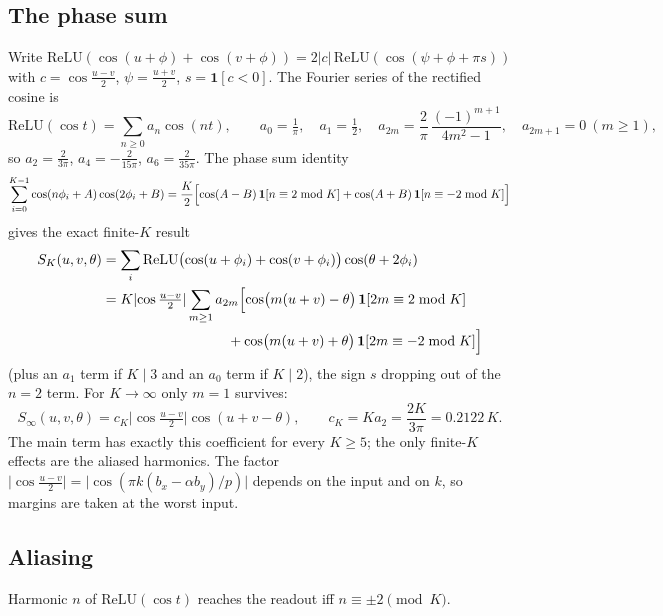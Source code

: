 \documentclass[11pt]{article}
\theoremstyle{remark}
\newcommand{\relu}{\mathrm{ReLU}}
\newcommand{\abs}[1]{\lvert #1 \rvert}
\newcommand{\ind}[1]{\mathbf{1}[#1]}
\begin{document}
\subsection{The phase sum}

Write $\relu(\cos(u+\phi) + \cos(v+\phi)) = 2\abs{c}\,\relu(\cos(\psi + \phi + \pi s))$ with $c = \cos\tfrac{u-v}{2}$,
$\psi = \tfrac{u+v}{2}$, $s = \ind{c < 0}$. The Fourier series of the rectified cosine is
\[
\relu(\cos t) = \sum_{n \ge 0} a_n \cos(nt), \qquad a_0 = \tfrac{1}{\pi},\quad a_1 = \tfrac12,\quad
a_{2m} = \frac{2}{\pi}\,\frac{(-1)^{m+1}}{4m^2 - 1},\quad a_{2m+1} = 0\ (m \ge 1),
\]
so $a_2 = \tfrac{2}{3\pi}$, $a_4 = -\tfrac{2}{15\pi}$, $a_6 = \tfrac{2}{35\pi}$. The phase sum identity
\[
\sum_{i=0}^{K-1} \cos(n\phi_i + A)\cos(2\phi_i + B) = \frac{K}{2}\Bigl[\cos(A-B)\,\ind{n \equiv 2 \bmod K} + \cos(A+B)\,\ind{n \equiv -2 \bmod K}\Bigr]
\]
gives the exact finite-$K$ result
\begin{equation}\label{eq:SK}
\begin{split}
S_K(u,v,\theta) &= \sum_i \relu\bigl(\cos(u+\phi_i)+\cos(v+\phi_i)\bigr)\cos(\theta + 2\phi_i) \\
&= K \abs{\cos\tfrac{u-v}{2}} \sum_{m \ge 1} a_{2m}\Bigl[\cos\bigl(m(u+v) - \theta\bigr)\,\ind{2m \equiv 2 \bmod K} \\
&\hspace{9em} + \cos\bigl(m(u+v) + \theta\bigr)\,\ind{2m \equiv -2 \bmod K}\Bigr]
\end{split}
\end{equation}
(plus an $a_1$ term if $K \mid 3$ and an $a_0$ term if $K \mid 2$), the sign $s$ dropping out of the $n = 2$ term. For $K \to \infty$ only
$m = 1$ survives:
\begin{equation}\label{eq:Sinf}
S_\infty(u,v,\theta) = c_K \abs{\cos\tfrac{u-v}{2}}\cos(u + v - \theta), \qquad c_K = K a_2 = \frac{2K}{3\pi} = 0.2122\,K .
\end{equation}
The main term has exactly this coefficient for every $K \ge 5$; the only finite-$K$ effects are the aliased harmonics. The factor
$\abs{\cos\tfrac{u-v}{2}} = \abs{\cos(\pi k(b_x - \alpha b_y)/p)}$ depends on the input and on $k$, so margins are taken at the worst
input.

\subsection{Aliasing}

Harmonic $n$ of $\relu(\cos t)$ reaches the readout iff $n \equiv \pm 2 \pmod K$.
\end{document}
